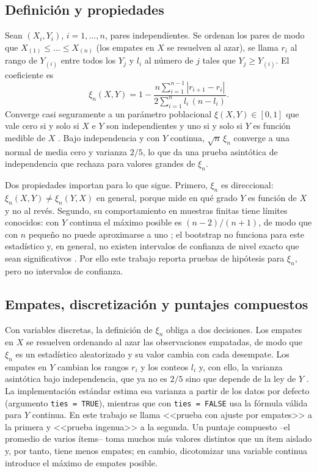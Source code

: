 \documentclass[man,donotrepeattitle,floatsintext]{apa7}
\begin{document}
\subsection{Definición y propiedades}

Sean $(X_i,Y_i)$, $i=1,\dots,n$, pares independientes. Se ordenan los pares de modo que $X_{(1)}\le\dots\le X_{(n)}$ (los empates en $X$ se resuelven al azar), se llama $r_i$ al rango de $Y_{(i)}$ entre todos los $Y_j$ y $l_i$ al número de $j$ tales que $Y_j\ge Y_{(i)}$. El coeficiente es
\begin{equation}
\xi_n(X,Y) = 1 - \frac{n\sum_{i=1}^{n-1}|r_{i+1}-r_i|}{2\sum_{i=1}^{n} l_i\,(n-l_i)}.
\end{equation}
Converge casi seguramente a un parámetro poblacional $\xi(X,Y)\in[0,1]$ que vale cero si y solo si $X$ e $Y$ son independientes y uno si y solo si $Y$ es función medible de $X$ \parencite{chatterjee2021}. Bajo independencia y con $Y$ continua, $\sqrt{n}\,\xi_n$ converge a una normal de media cero y varianza $2/5$, lo que da una prueba asintótica de independencia que rechaza para valores grandes de $\xi_n$.

Dos propiedades importan para lo que sigue. Primero, $\xi_n$ es direccional: $\xi_n(X,Y)\neq\xi_n(Y,X)$ en general, porque mide en qué grado $Y$ es función de $X$ y no al revés. Segundo, su comportamiento en muestras finitas tiene límites conocidos: con $Y$ continua el máximo posible es $(n-2)/(n+1)$, de modo que con $n$ pequeño no puede aproximarse a uno \parencite{dalitz2024}; el bootstrap no funciona para este estadístico \parencite{dalitz2024} y, en general, no existen intervalos de confianza de nivel exacto que sean significativos \parencite{bucher2025}. Por ello este trabajo reporta pruebas de hipótesis para $\xi_n$, pero no intervalos de confianza.

\subsection{Empates, discretización y puntajes compuestos}

Con variables discretas, la definición de $\xi_n$ obliga a dos decisiones. Los empates en $X$ se resuelven ordenando al azar las observaciones empatadas, de modo que $\xi_n$ es un estadístico aleatorizado y su valor cambia con cada desempate. Los empates en $Y$ cambian los rangos $r_i$ y los conteos $l_i$ y, con ello, la varianza asintótica bajo independencia, que ya no es $2/5$ sino que depende de la ley de $Y$ \parencite{chatterjee2021}. La implementación estándar \parencite{chatterjee2023xicor} estima esa varianza a partir de los datos por defecto (argumento \texttt{ties = TRUE}), mientras que con \texttt{ties = FALSE} usa la fórmula válida para $Y$ continua. En este trabajo se llama <<prueba con ajuste por empates>> a la primera y <<prueba ingenua>> a la segunda. Un puntaje compuesto --el promedio de varios ítems-- toma muchos más valores distintos que un ítem aislado y, por tanto, tiene menos empates; en cambio, dicotomizar una variable continua \parencite{maccallum2002} introduce el máximo de empates posible.
\end{document}
